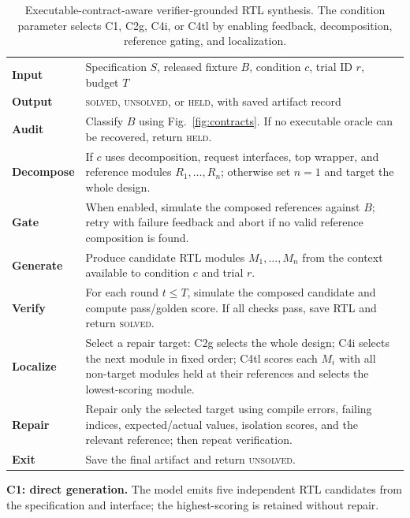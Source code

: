 \documentclass[sigconf,anonymous]{acmart}
\newcommand{\cOne}{C1\xspace}
\newcommand{\cTwoG}{C2g\xspace}
\newcommand{\cFourI}{C4i\xspace}
\newcommand{\cFourTL}{C4tl\xspace}
\begin{document}
\begin{table}[t]
\centering
\caption{Executable-contract-aware verifier-grounded RTL synthesis. The condition parameter selects \cOne, \cTwoG, \cFourI, or \cFourTL by enabling feedback, decomposition, reference gating, and localization.}
\label{alg:synthesis}
\footnotesize
\setlength{\tabcolsep}{5pt}
\renewcommand{\arraystretch}{1.12}
\begin{tabular}{p{1.35cm}p{13.6cm}}
\toprule
\textbf{Input} & Specification $S$, released fixture $B$, condition $c$, trial ID $r$, budget $T$ \\
\textbf{Output} & \textsc{solved}, \textsc{unsolved}, or \textsc{held}, with saved artifact record \\
\midrule
\textbf{Audit} & Classify $B$ using Fig.~\ref{fig:contracts}. If no executable oracle can be recovered, return \textsc{held}. \\
\textbf{Decompose} & If $c$ uses decomposition, request interfaces, top wrapper, and reference modules $R_1,\ldots,R_n$; otherwise set $n=1$ and target the whole design. \\
\textbf{Gate} & When enabled, simulate the composed references against $B$; retry with failure feedback and abort if no valid reference composition is found. \\
\textbf{Generate} & Produce candidate RTL modules $M_1,\ldots,M_n$ from the context available to condition $c$ and trial $r$. \\
\textbf{Verify} & For each round $t \leq T$, simulate the composed candidate and compute pass/golden score. If all checks pass, save RTL and return \textsc{solved}. \\
\textbf{Localize} & Select a repair target: \cTwoG selects the whole design; \cFourI selects the next module in fixed order; \cFourTL scores each $M_i$ with all non-target modules held at their references and selects the lowest-scoring module. \\
\textbf{Repair} & Repair only the selected target using compile errors, failing indices, expected/actual values, isolation scores, and the relevant reference; then repeat verification. \\
\textbf{Exit} & Save the final artifact and return \textsc{unsolved}. \\
\bottomrule
\end{tabular}
\renewcommand{\arraystretch}{1.0}
\end{table}

\textbf{\cOne: direct generation.}
The model emits five independent RTL candidates from the specification and interface; the highest-scoring is retained without repair.
\end{document}
